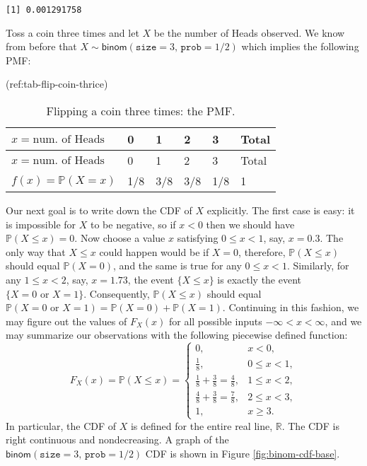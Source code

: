 \documentclass[]{book}
\numberwithin{equation}{chapter}
\numberwithin{figure}{chapter}
\theoremstyle{plain}
\theoremstyle{definition}
\theoremstyle{remark}
\theoremstyle{definition}
\theoremstyle{definition}
\theoremstyle{remark}
\let\BeginKnitrBlock\begin \let\EndKnitrBlock\end
\begin{document}
\begin{verbatim}
[1] 0.001291758
\end{verbatim}

\bigskip

\BeginKnitrBlock{example}
\protect\hypertarget{ex:toss-coin-3-withr}{}{\label{ex:toss-coin-3-withr}}Toss
a coin three times and let \(X\) be the number of Heads observed. We
know from before that
\(X\sim\mathsf{binom}(\mathtt{size}=3,\,\mathtt{prob}=1/2)\) which
implies the following PMF:
\EndKnitrBlock{example}

(ref:tab-flip-coin-thrice)

\begin{longtable}[]{@{}llllll@{}}
\caption{Flipping a coin three times: the PMF.}\tabularnewline
\toprule
\(x=\mbox{num. of Heads}\) & 0 & 1 & 2 & 3 & Total\tabularnewline
\midrule
\endfirsthead
\toprule
\(x=\mbox{num. of Heads}\) & 0 & 1 & 2 & 3 & Total\tabularnewline
\midrule
\endhead
\(f(x) = \mathbb{P}(X = x)\) & 1/8 & 3/8 & 3/8 & 1/8 & 1\tabularnewline
\bottomrule
\end{longtable}

Our next goal is to write down the CDF of \(X\) explicitly. The first
case is easy: it is impossible for \(X\) to be negative, so if \(x<0\)
then we should have \(\mathbb{P}(X\leq x)=0\). Now choose a value \(x\)
satisfying \(0\leq x<1\), say, \(x=0.3\). The only way that \(X\leq x\)
could happen would be if \(X=0\), therefore, \(\mathbb{P}(X\leq x)\)
should equal \(\mathbb{P}(X=0)\), and the same is true for any
\(0\leq x<1\). Similarly, for any \(1\leq x<2\), say, \(x=1.73\), the
event \(\{ X\leq x \}\) is exactly the event
\(\{ X=0\mbox{ or }X=1 \}\). Consequently, \(\mathbb{P}(X\leq x)\)
should equal
\(\mathbb{P}(X=0\mbox{ or }X=1)=\mathbb{P}(X=0)+\mathbb{P}(X=1)\).
Continuing in this fashion, we may figure out the values of \(F_{X}(x)\)
for all possible inputs \(-\infty<x<\infty\), and we may summarize our
observations with the following piecewise defined function:
\[ F_{X}(x)=\mathbb{P}(X\leq x) = \begin{cases} 0, & x < 0,\\ \frac{1}{8}, & 0\leq x < 1,\\ \frac{1}{8} + \frac{3}{8} = \frac{4}{8}, & 1\leq x < 2,\\ \frac{4}{8} + \frac{3}{8} = \frac{7}{8}, & 2\leq x < 3,\\ 1, & x \geq 3. \end{cases} \]
In particular, the CDF of \(X\) is defined for the entire real line,
\(\mathbb{R}\). The CDF is right continuous and nondecreasing. A graph
of the \(\mathsf{binom}(\mathtt{size}=3,\,\mathtt{prob}=1/2)\) CDF is
shown in Figure \ref{fig:binom-cdf-base}.
\end{document}
